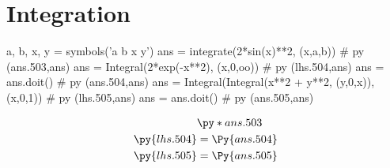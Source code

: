 \section*{Integration}

\vspace{-10pt}

\begin{python}
   a, b, x, y = symbols('a b x y')
   ans = integrate(2*sin(x)**2, (x,a,b))                     # py (ans.503,ans)
   ans = Integral(2*exp(-x**2), (x,0,oo))                    # py (lhs.504,ans)
   ans = ans.doit()                                          # py (ans.504,ans)
   ans = Integral(Integral(x**2 + y**2, (y,0,x)), (x,0,1))   # py (lhs.505,ans)
   ans = ans.doit()                                          # py (ans.505,ans)
\end{python}

\begin{align*}
   &\py*{ans.503}\\
    \py{lhs.504}&=\Py{ans.504}\\
    \py{lhs.505}&=\Py{ans.505}
\end{align*}
